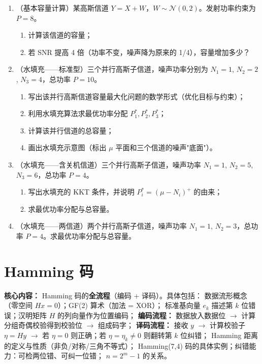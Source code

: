 \documentclass[12pt,a4paper]{ctexart}
\begin{document}
\begin{enumerate}[label=\textbf{\arabic*.}, leftmargin=*]
\item （基本容量计算）某高斯信道 $Y = X + W$，$W \sim \mathcal{N}(0, 2)$。发射功率约束为 $P = 8$。
\begin{enumerate}
  \item 计算该信道的容量；
  \item 若 SNR 提高 4 倍（功率不变，噪声降为原来的 1/4），容量增加多少？
\end{enumerate}

\item （水填充——标准型）三个并行高斯子信道，噪声功率分别为 $N_1=1$, $N_2=2$, $N_3=4$，总功率 $P=10$。
\begin{enumerate}
  \item 写出该并行高斯信道容量最大化问题的数学形式（优化目标与约束）；
  \item 利用水填充算法求最优功率分配 $P_1^*, P_2^*, P_3^*$；
  \item 计算该并行信道的总容量；
  \item 画出水填充示意图（标出 $\mu$ 平面和三个信道的噪声"底面"）。
\end{enumerate}

\item （水填充——含关机信道）三个并行高斯子信道，噪声功率 $N_1=1$, $N_2=5$, $N_3=6$，总功率 $P=4$。
\begin{enumerate}
  \item 写出水填充的 KKT 条件，并说明 $P_i^*=(\mu-N_i)^+$ 的由来；
  \item 求最优功率分配与总容量。
\end{enumerate}

\item （水填充——两信道）两个并行高斯子信道，噪声功率 $N_1=1$, $N_2=3$，总功率 $P=4$。求最优功率分配与总容量。
\end{enumerate}

\newpage

\section{Hamming 码}

\begin{notetested}
\textbf{核心内容：} Hamming 码的\textbf{全流程}（编码 + 译码）。具体包括：
数据流形概念（零空间 $Hx=0$）；GF(2) 算术（加法 = XOR）；
标准基向量 $e_k$ 描述第 $k$ 位错误；汉明矩阵 $H$ 的列向量作为位置编码；
\textbf{编码流程：} 数据放入数据位 $\to$ 计算分组奇偶校验得到校验位 $\to$ 组成码字；
\textbf{译码流程：} 接收 $y$ $\to$ 计算校验子 $\eta = Hy$ $\to$
若 $\eta=0$ 则正确；若 $\eta=\eta_k\neq 0$ 则翻转第 $k$ 位纠错；
Hamming 距离的定义与性质（非负/对称/三角不等式）；
Hamming(7,4) 码的具体实例；纠错能力：可检两位错、可纠一位错；
$n=2^m-1$ 的关系。
\end{notetested}
\end{document}
